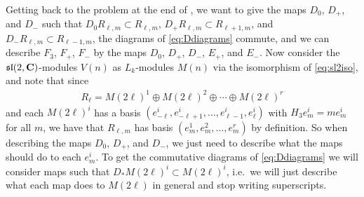 Getting back to the problem at the end of , we want to give the maps $D_0$, $D_+$, and $D_-$ such that $D_0R_{\ell,m}\subset R_{\ell,m}$, $D_+R_{\ell,m}\subset R_{\ell+1,m}$, and $D_-R_{\ell,m}\subset R_{\ell-1,m}$, the diagrams of \cref{eq:Ddiagrams} commute, and we can describe $F_3$, $F_+$, $F_-$ by the maps $D_0$, $D_+$, $D_-$, $E_+$, and $E_-$. Now consider the $\mathfrak{sl}(2,\mathbf{C})$-modules $V(n)$ as $L_k$-modules $M(n)$ via the isomorphism of \cref{eq:sl2iso}, and note that since
\begin{align*}
  R_\ell = M(2\ell)^1 \oplus M(2\ell)^2 \oplus \dotsb \oplus M(2\ell)^r
\end{align*}
and each $M(2\ell)^{i}$ has a basis $(e_{-\ell}^{i},e_{-\ell+1}^{i},\dotsc,e_{\ell-1}^{i},e_{\ell}^{i})$ with $H_3e_m^{i} = m e_m^{i}$ for all $m$, we have that $R_{\ell,m}$ has basis $(e_m^1,e_m^2,\dotsc,e_m^r)$ by definition. So when describing the maps $D_0$, $D_+$, and $D_-$, we just need to describe what the maps should do to each $e_m^{i}$. To get the commutative diagrams of \cref{eq:Ddiagrams} we will consider maps such that $D_*M(2\ell)^{i} \subset M(2\ell)^{i}$, i.e.\ we will just describe what each map does to $M(2\ell)$ in general and stop writing superscripts.

